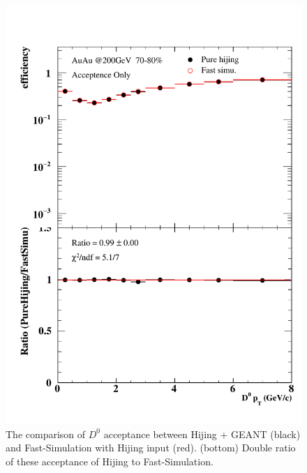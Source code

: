 \begin{figure}[htbp]
\begin{minipage}[htbp]{0.47\linewidth}
\centering
\includegraphics[width=1.0\textwidth,angle=0]{figure/Run14_D0HFT/70_80_0.pdf}
\caption{ The comparison of $D^0$ acceptance between Hijing + GEANT (black) and Fast-Simulation with Hijing input (red). (bottom) Double ratio of these acceptance of Hijing to Fast-Simulation.\label{70_80_0}}
\end{minipage}
\hfill
\begin{minipage}[htbp]{0.47\linewidth}
\centering

\end{minipage}
\end{figure}

